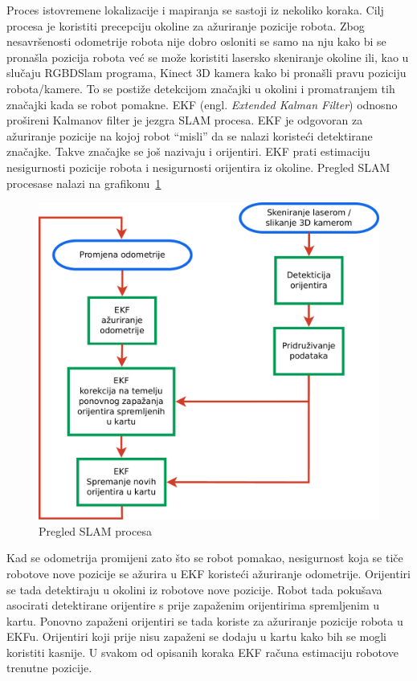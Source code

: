 Proces istovremene lokalizacije i mapiranja se sastoji iz nekoliko
koraka. Cilj procesa je koristiti precepciju okoline za ažuriranje
pozicije robota.  Zbog nesavršenosti odometrije robota nije dobro
osloniti se samo na nju kako bi se pronašla pozicija robota već se može
koristiti lasersko skeniranje okoline ili, kao u slučaju RGBDSlam
programa, Kinect 3D kamera kako bi pronašli pravu poziciju
robota/kamere. To se postiže detekcijom značajki u okolini i
promatranjem tih značajki kada se robot pomakne. EKF (engl.
\textit{Extended Kalman Filter}) odnosno prošireni Kalmanov filter je
jezgra SLAM procesa. EKF je odgovoran za ažuriranje pozicije na kojoj
robot ``misli'' da se nalazi koristeći detektirane značajke. Takve
značajke se još nazivaju i orijentiri. EKF prati estimaciju nesigurnosti
pozicije robota i nesigurnosti orijentira iz okoline. Pregled SLAM
procesa\footnotemark[1] se nalazi na
grafikonu~\ref{fig:slam-overview.pdf}  


\begin{figure}[h]
\renewcommand{\figurename}{Grafikon}
\centering
\includegraphics[scale=0.4]{figures/slam-overview.pdf}
\caption{Pregled SLAM procesa}
\label{fig:slam-overview.pdf}
\end{figure}

Kad se odometrija promijeni zato što se robot pomakao, nesigurnost koja
se tiče robotove nove pozicije se ažurira u EKF koristeći ažuriranje
odometrije. Orijentiri se tada detektiraju u okolini iz robotove nove
pozicije. Robot tada pokušava asocirati detektirane orijentire s prije
zapaženim orijentirima spremljenim u kartu. Ponovno zapaženi orijentiri
se tada koriste za ažuriranje pozicije robota u EKFu. Orijentiri koji
prije nisu zapaženi se dodaju u kartu kako bih se mogli koristiti
kasnije. U svakom od opisanih koraka EKF računa estimaciju robotove
trenutne pozicije. 

